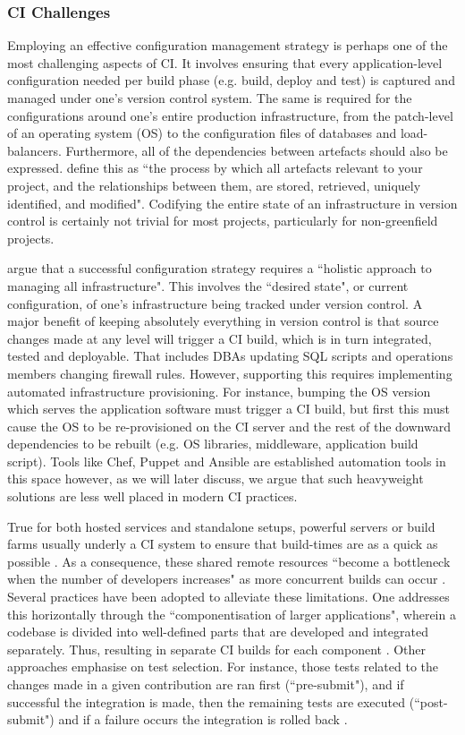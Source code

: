 \documentclass{report}
\begin{document}
\subsubsection{CI Challenges}
Employing an effective configuration management strategy is perhaps one of the
most challenging aspects of CI. It involves ensuring that every application-level configuration
needed per build phase (e.g. build, deploy and test) is captured and managed under one's
version control system. The same is required for the configurations around one's entire
production infrastructure, from the patch-level of an operating system (OS)
to the configuration files of databases and load-balancers. Furthermore, all of 
the dependencies between artefacts should also be expressed. \cite{Jez}
define this as ``the process by which all artefacts relevant to
your project, and the relationships between them, are stored, retrieved, uniquely
identified, and modified". Codifying the entire state of an infrastructure in
version control is certainly not trivial for most projects, particularly for non-greenfield projects.
\par
\cite{Jez} argue that a successful configuration strategy requires a ``holistic approach to 
managing all infrastructure". This involves the ``desired state", or current configuration, of 
one's infrastructure being tracked under version control. A major benefit of keeping
absolutely everything in version control is that source 
changes made at any level will trigger a CI build, which is in turn integrated, tested and deployable. 
That includes DBAs updating SQL scripts and operations members changing firewall 
rules. However, supporting this requires implementing automated infrastructure provisioning.
For instance, bumping the OS version which serves the application software
must trigger a CI build, but first this must cause 
the OS to be re-provisioned on the CI server and the rest of the downward dependencies 
to be rebuilt (e.g. OS libraries, middleware, application build script).  Tools like Chef, Puppet 
and Ansible are established automation tools in this space however, as we will later discuss, 
we argue that such heavyweight solutions are less well placed in modern CI practices.
\par
True for both hosted services and standalone setups, powerful servers or build farms usually 
underly a CI system to ensure that build-times are as a quick as possible \citep{Campos}. As a consequence,
these shared remote resources ``become a bottleneck when the number
of developers increases" as more concurrent builds can occur \citep{Gambi}. Several practices have
been adopted to alleviate these limitations. One addresses this horizontally through the ``componentisation of larger
applications", wherein a codebase is divided into well-defined parts that are developed 
and integrated separately. Thus, resulting in separate CI builds for each component \citep{Jez}.
Other approaches emphasise on test selection. For instance, those tests related to the changes made in a given contribution
are ran first (``pre-submit"), and if successful the integration is made, then the remaining tests are executed (``post-submit") and if a failure occurs the integration is rolled back \citep{Elbaum}.
\end{document}
